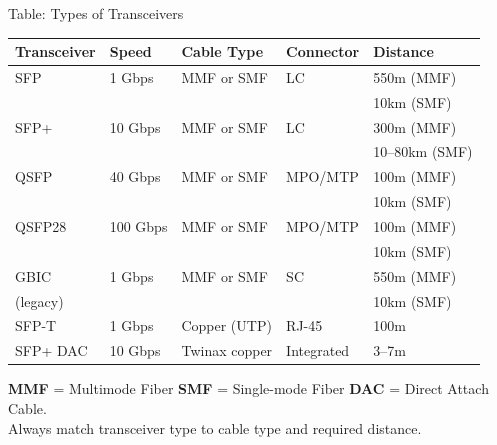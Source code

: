 \documentclass[aspectratio=169]{beamer}  %
\begin{document}
\begin{frame}[t,shrink=20]{Table: Types of Transceivers}
    \begin{center}
        \scriptsize
        \begin{tabular}{l l l l l}
            \toprule
            \textbf{Transceiver} & \textbf{Speed} & \textbf{Cable Type} & \textbf{Connector} & \textbf{Distance} \\
            \midrule
            SFP & 1 Gbps & MMF or SMF & LC & 550m (MMF) \\
            & & & & 10km (SMF) \\
            \midrule
            SFP+ & 10 Gbps & MMF or SMF & LC & 300m (MMF) \\
            & & & & 10--80km (SMF) \\
            \midrule
            QSFP & 40 Gbps & MMF or SMF & MPO/MTP & 100m (MMF) \\
            & & & & 10km (SMF) \\
            \midrule
            QSFP28 & 100 Gbps & MMF or SMF & MPO/MTP & 100m (MMF) \\
            & & & & 10km (SMF) \\
            \midrule
            GBIC & 1 Gbps & MMF or SMF & SC & 550m (MMF) \\
            (legacy) & & & & 10km (SMF) \\
            \midrule
            SFP-T & 1 Gbps & Copper (UTP) & RJ-45 & 100m \\
            \midrule
            SFP+ DAC & 10 Gbps & Twinax copper & Integrated & 3--7m \\
            \bottomrule
        \end{tabular}
    \end{center}
    
    \vspace{0.2em}
    \centering\scriptsize
    \textbf{MMF} = Multimode Fiber \quad \textbf{SMF} = Single-mode Fiber \quad \textbf{DAC} = Direct Attach Cable.
    \\
    Always match transceiver type to cable type and required distance.
\end{frame}
\end{document}

